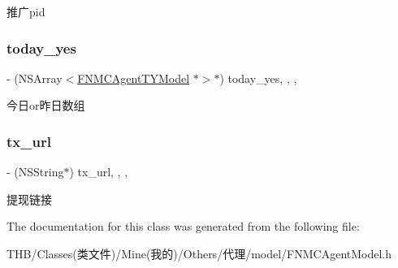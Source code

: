 推广pid \mbox{\label{interface_f_n_m_c_agent_model_a2dfe1327d3ad029e901a2fee1424b124}} 
\subsubsection{\texorpdfstring{today\+\_\+yes}{today\_yes}}
{\footnotesize\ttfamily -\/ (N\+S\+Array$<$\mbox{\hyperlink{interface_f_n_m_c_agent_t_y_model}{F\+N\+M\+C\+Agent\+T\+Y\+Model}} $\ast$$>$$\ast$) today\+\_\+yes\hspace{0.3cm}{\ttfamily [read]}, {\ttfamily [write]}, {\ttfamily [nonatomic]}, {\ttfamily [strong]}}

今日or昨日数组 \mbox{\label{interface_f_n_m_c_agent_model_a9a35f7986ae552b21373d3234d3d187c}} 
\subsubsection{\texorpdfstring{tx\+\_\+url}{tx\_url}}
{\footnotesize\ttfamily -\/ (N\+S\+String$\ast$) tx\+\_\+url\hspace{0.3cm}{\ttfamily [read]}, {\ttfamily [write]}, {\ttfamily [nonatomic]}, {\ttfamily [copy]}}

提现链接 

The documentation for this class was generated from the following file\+:\begin{DoxyCompactItemize}
\item 
T\+H\+B/\+Classes(类文件)/\+Mine(我的)/\+Others/代理/model/F\+N\+M\+C\+Agent\+Model.\+h\end{DoxyCompactItemize}
